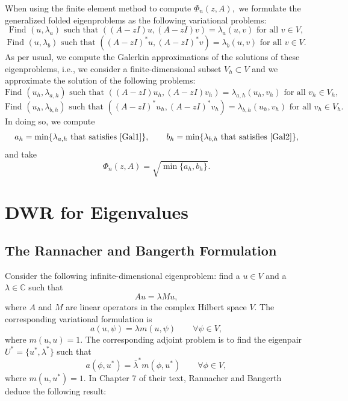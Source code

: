 \documentclass[12pt,a4paper]{article}
\theoremstyle{boldthm}
\theoremstyle{bolddefn}
\begin{document}
When using the finite element method to compute $\Phi_n(z, A),$ we formulate the generalized folded eigenproblems as the following variational problems: 
\begin{equation}
    \text{Find } (u, \lambda_a) \text{ such that } ((A-zI)u, (A-zI)v) = \lambda_a (u, v) \text{ for all } v \in V,
\end{equation}
\begin{equation}
    \text{Find } (u, \lambda_b) \text{ such that } ((A-zI)^*u, (A-zI)^*v) = \lambda_b (u, v) \text{ for all } v \in V.
\end{equation}
As per usual, we compute the Galerkin approximations of the solutions of these eigenproblems, i.e., we consider a finite-dimensional subset $V_h \subset V$ and we approximate the solution of the following problems: 
\begin{equation}\label{Gal1}
    \text{Find } (u_h, \lambda_{a,h}) \text{ such that } ((A-zI)u_h, (A-zI)v_h) = \lambda_{a,h} (u_h, v_h) \text{ for all } v_h \in V_h,
\end{equation}
\begin{equation}\label{Gal2}
    \text{Find } (u_h, \lambda_{b,h}) \text{ such that } ((A-zI)^*u_h, (A-zI)^*v_h) = \lambda_{b,h} (u_h, v_h) \text{ for all } v_h \in V_h.
\end{equation}
In doing so, we compute
\begin{equation}
    a_h = \min\{\lambda_{a, h} \text{ that satisfies \eqref{Gal1}}\}, \qquad b_h = \min\{\lambda_{b, h} \text{ that satisfies \eqref{Gal2}} \},
\end{equation}
and take
\begin{equation}
   \Phi_n(z, A) = \sqrt{ \min\{a_h, b_h\} }. 
\end{equation}



\section{DWR for Eigenvalues}

\subsection{The Rannacher and Bangerth Formulation}


Consider the following infinite-dimensional eigenproblem: find a $u \in V$ and a $\lambda \in \mathbb{C}$ such that
\begin{equation}
    Au = \lambda M u,
\end{equation}
where $A$ and $M$ are linear operators in the complex Hilbert space $V.$ The corresponding variational formulation is 
\begin{equation} \label{primal}
    a(u, \psi) = \lambda m(u, \psi) \qquad \forall \psi \in V,
\end{equation}
where $m(u, u)=1.$ The corresponding adjoint problem is to find the eigenpair $U^* = \{u^*, \lambda^*\}$ such that
\begin{equation} \label{dual}
   a(\phi, u^*) = \overline \lambda^* m(\phi, u^*) \qquad \forall \phi \in V, 
\end{equation}
where $m(u, u^*) = 1.$
In Chapter 7 of their text, Rannacher and Bangerth deduce the following result:
\end{document}
